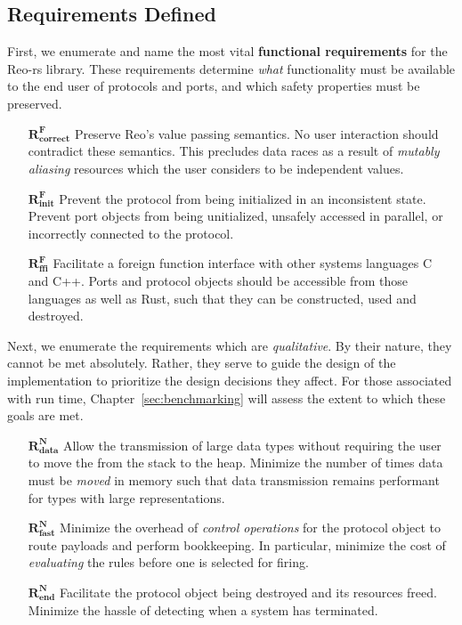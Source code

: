 \subsection{Requirements Defined}
First, we enumerate and name the most vital \textbf{functional requirements} for the Reo-rs library. These requirements determine \textit{what} functionality must be available to the end user of protocols and ports, and which safety properties must be preserved.

\begin{enumerate}
	\item[$\boldsymbol{R^F_{correct}}$] Preserve Reo's value passing semantics. No user interaction should contradict these semantics. This precludes data races as a result of \textit{mutably aliasing} resources which the user considers to be independent values.
	
	\item[$\boldsymbol{R^F_{init}}$] Prevent the protocol from being initialized in an inconsistent state. Prevent port objects from being unitialized, unsafely accessed in parallel, or incorrectly connected to the protocol.
	
	\item[$\boldsymbol{R^F_{ffi}}$] Facilitate a foreign function interface with other systems languages C and C++. Ports and protocol objects should be accessible from those languages as well as Rust, such that they can be constructed, used and destroyed.
\end{enumerate}

Next, we enumerate the requirements which are \textit{qualitative}. By their nature, they cannot be met absolutely. Rather, they serve to guide the design of the implementation to prioritize the design decisions they affect. For those associated with run time, Chapter~\ref{sec:benchmarking} will assess the extent to which these goals are met.

\begin{enumerate}
	\item[$\boldsymbol{R^N_{data}}$] Allow the transmission of large data types without requiring the user to move the from the stack to the heap. Minimize the number of times data must be \textit{moved} in memory such that data transmission remains performant for types with large representations.	
	
	\item[$\boldsymbol{R^N_{fast}}$] Minimize the overhead of \textit{control
	operations} for the protocol object to route payloads and perform bookkeeping. In particular, minimize the cost of \textit{evaluating} the rules before one is selected for firing.
	
	
	\item[$\boldsymbol{R^N_{end}}$] Facilitate the protocol object being destroyed and its resources freed. Minimize the hassle of detecting when a system has terminated.
\end{enumerate}

